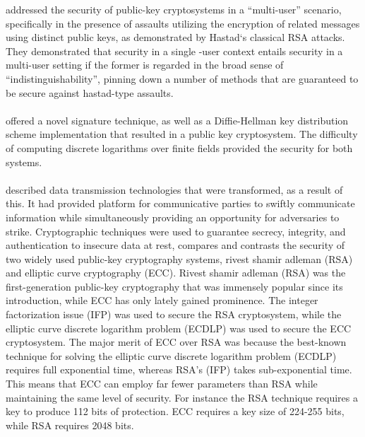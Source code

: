\cite{Bellare2000} addressed the security of public-key cryptosystems in a ``multi-user'' scenario, specifically in the presence of assaults utilizing the encryption of related messages using distinct public keys, as demonstrated by Hastad`s classical RSA attacks. They demonstrated that security in a single -user context entails security in a multi-user setting if the former is regarded in the broad sense of ``indistinguishability'', pinning down a number of methods that are guaranteed to be secure against hastad-type assaults.\\\\
\cite{ElGamal1985} offered a novel signature technique, as well as a Diffie-Hellman key distribution scheme implementation that resulted in a public key cryptosystem. The difficulty of computing discrete logarithms over finite fields provided the security for both systems.\\\\
 \cite{mahto2016security}  described data transmission technologies that were transformed, as a result of this. It had provided platform for communicative parties to swiftly communicate information while simultaneously providing an opportunity for adversaries to strike. Cryptographic techniques were used to guarantee secrecy, integrity, and authentication to insecure data at rest, compares and contrasts the security of two widely used public-key cryptography systems, rivest shamir adleman (RSA) and elliptic curve cryptography (ECC). Rivest shamir adleman (RSA) was the first-generation public-key cryptography that was immensely popular since its introduction, while ECC has only lately gained prominence. The integer factorization issue (IFP) was used to secure the RSA cryptosystem, while the elliptic curve discrete logarithm problem (ECDLP) was used to secure the ECC cryptosystem. The major merit of ECC over RSA was because the best-known technique for solving the  elliptic curve discrete logarithm problem (ECDLP) requires full exponential time, whereas RSA's (IFP) takes sub-exponential time. This means that ECC can employ far fewer parameters than RSA while maintaining the same level of security. For instance the RSA technique requires a key to produce 112 bits of protection. ECC requires a key size of 224-255 bits, while RSA requires 2048 bits.\\\\
